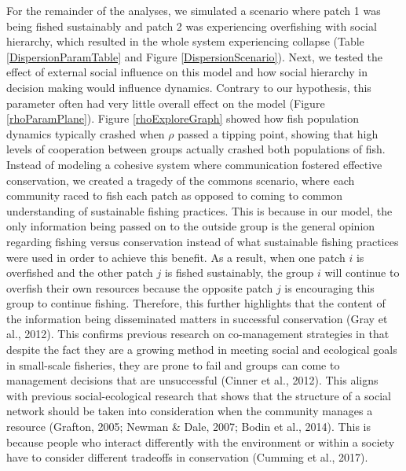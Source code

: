 \documentclass[
]{article}
\begin{document}
For the remainder of the analyses, we simulated a scenario where patch 1 was being fished sustainably and patch 2 was experiencing overfishing with social hierarchy, which resulted in the whole system experiencing collapse (Table \ref{DispersionParamTable} and Figure \ref{DispersionScenario}). Next, we tested the effect of external social influence on this model and how social hierarchy in decision making would influence dynamics. Contrary to our hypothesis, this parameter often had very little overall effect on the model (Figure \ref{rhoParamPlane}). Figure \ref{rhoExploreGraph} showed how fish population dynamics typically crashed when \(\rho\) passed a tipping point, showing that high levels of cooperation between groups actually crashed both populations of fish. Instead of modeling a cohesive system where communication fostered effective conservation, we created a tragedy of the commons scenario, where each community raced to fish each patch as opposed to coming to common understanding of sustainable fishing practices. This is because in our model, the only information being passed on to the outside group is the general opinion regarding fishing versus conservation instead of what sustainable fishing practices were used in order to achieve this benefit. As a result, when one patch \(i\) is overfished and the other patch \(j\) is fished sustainably, the group \(i\) will continue to overfish their own resources because the opposite patch \(j\) is encouraging this group to continue fishing. Therefore, this further highlights that the content of the information being disseminated matters in successful conservation (Gray et al., 2012). This confirms previous research on co-management strategies in that despite the fact they are a growing method in meeting social and ecological goals in small-scale fisheries, they are prone to fail and groups can come to management decisions that are unsuccessful (Cinner et al., 2012). This aligns with previous social-ecological research that shows that the structure of a social network should be taken into consideration when the community manages a resource (Grafton, 2005; Newman \& Dale, 2007; Bodin et al., 2014). This is because people who interact differently with the environment or within a society have to consider different tradeoffs in conservation (Cumming et al., 2017).
\end{document}
